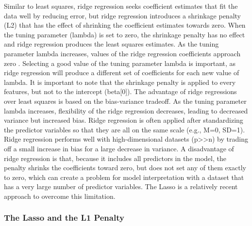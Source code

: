 \documentclass[sigconf]{acmart}
\begin{document}
Similar to least squares, ridge regression seeks coefficient estimates that
fit the data well by reducing error, but ridge regression introduces a 
shrinkage penalty (L2) that has the effect of shrinking the coefficient 
estimates towards zero. When the tuning parameter (lambda) is set to zero, 
the shrinkage penalty has no effect and ridge regression produces the least
squares estimates. As the tuning parameter lambda increases, values of the 
ridge regression coefficients approach zero \cite{statlearn13}. Selecting a 
good value of the tuning parameter lambda is important, as ridge
regression will produce a different set of coefficients for each new value of 
lambda. It is important to note that the shrinkage penalty is applied to every
features, but not to the intercept (beta[0]). The advantage of ridge 
regressions over least squares is based on the bias-variance tradeoff. As 
the tuning parameter lambda increases, flexibility of the ridge regression 
decreases, leading to decreased variance but increased bias. Ridge regression 
is often applied after standardizing the predictor variables so that they are 
all on the same scale (e.g., M=0, SD=1). Ridge regression performs 
well with high-dimensional datasets (p>>n) by trading off a small increase
in bias for a large decrease in variance. A disadvantage of ridge regression 
is that, because it includes all predictors in the model, the penalty shrinks
the coefficients toward zero, but does not set any of them exactly to zero, 
which can create a problem for model interpretation with a dataset that
has a very large number of predictor variables. The Lasso is a relatively
recent approach to overcome this limitation. 

\subsubsection{The Lasso and the L1 Penalty} 
\end{document}
